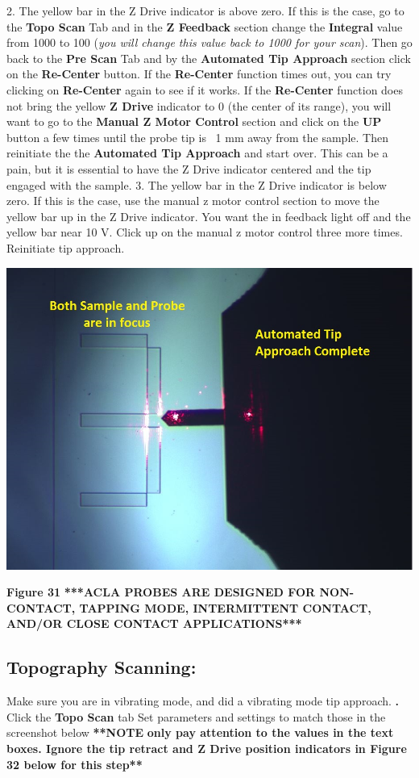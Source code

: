 \documentclass{../lab}
\begin{document}
2. The yellow bar in the Z Drive indicator is above zero. If this is the case, go to the \textbf{Topo Scan }Tab and in the \textbf{Z Feedback }section change the \textbf{Integral }value from 1000 to 100 (\emph{you will change this value back to 1000 for your scan}).  Then go back to the \textbf{Pre Scan }Tab and by the \textbf{Automated Tip Approach }section click on the \textbf{Re-Center} button.  If the \textbf{Re-Center }function times out, you can try clicking on \textbf{Re-Center }again to see if it works.  If the \textbf{Re-Center }function does not bring the yellow \textbf{Z Drive }indicator to 0 (the center of its range), you will want to go to the \textbf{Manual Z Motor Control }section and click on the \textbf{UP }button a few times until the probe tip is ~1 mm away from the sample.  Then reinitiate the the \textbf{Automated Tip Approach} and start over. This can be a pain, but it is essential to have the Z Drive indicator centered and the tip engaged with the sample.
3. The yellow bar in the Z Drive indicator is below zero. If this is the case, use the manual z motor control section to move the yellow bar up in the Z Drive indicator. You want the in feedback light off and the yellow bar near 10 V. Click up on the manual z motor control three more times. Reinitiate tip approach.



\begin{center}
    \href{http://experimentationlab.berkeley.edu/sites/default/files/AFMImages/bothfocused.jpg}{\includegraphics[width=0.5\linewidth]{images/bothfocused.jpg}}
\end{center}


\textbf{Figure 31}
\textbf{***ACLA PROBES ARE DESIGNED FOR NON-CONTACT, TAPPING MODE, INTERMITTENT CONTACT, AND/OR CLOSE CONTACT APPLICATIONS***}
\textbf{}



\subsection{Topography Scanning:}
Make sure you are in vibrating mode, and did a vibrating mode tip approach. \textbf{.}
Click the \textbf{Topo Scan } tab
Set parameters and settings to match those in the screenshot below
\textbf{**NOTE} \textbf{only pay attention to the values in the text boxes.  Ignore the tip retract and Z Drive position indicators in Figure 32 below for this step**}
\end{document}
